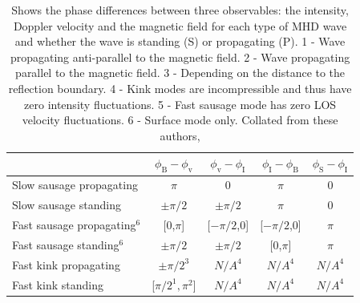     \begin{table}
        \centering
        \begin{tabular}{l|c|c|c|c}
            &$\phi_{\mathrm{B}}-\phi_{\mathrm{v}}$&$\phi_{\mathrm{v}}-\phi_{\mathrm{I}}$&$\phi_{\mathrm{I}}-\phi_{\mathrm{B}}$&$\phi_{\mathrm{S}}-\phi_{\mathrm{I}}$ \\ \hline\hline
        Slow sausage propagating        & $\pi$ & 0 & $\pi$ & 0 \\
        Slow sausage standing           & $\pm\pi/2$ & $\pm\pi/2$ & $\pi$ & 0 \\
        Fast sausage propagating$^6$    & [0,$\pi$] & [$-\pi/2$,0] & [$-\pi/2$,0] & $\pi$ \\
        Fast sausage standing$^6$       & $\pm\pi/2$ & $\pm\pi/2$ & [0,$\pi$] & $\pi$  \\
        Fast kink propagating       	& $\pm\pi/2^3$ & $N/A^4$ & $N/A^4$ & $N/A^4$ \\
        Fast kink standing          	& [$\pi/2^1,\pi^2$] & $N/A^4$ & $N/A^4$ & $N/A^4$ \\ \hline
        \end{tabular}
        \caption{
            Shows the phase differences between three observables: the intensity, Doppler velocity and the magnetic field for each type of MHD wave and whether the wave is standing (S) or propagating (P).
            1 - Wave propagating anti-parallel to the magnetic field.
            2 - Wave propagating parallel to the magnetic field. 
            3 - Depending on the distance to the reflection boundary.
            4 - Kink modes are incompressible and thus have zero intensity fluctuations.
            5 - Fast sausage mode has zero LOS velocity fluctuations.
            6 - Surface mode only.
            Collated from these authors, \cite{CLOO,PMHDW,Moreels2013,Moreels2013b,2015A&A...579A..73M}}
        \label{tab:phase}
    \end{table}